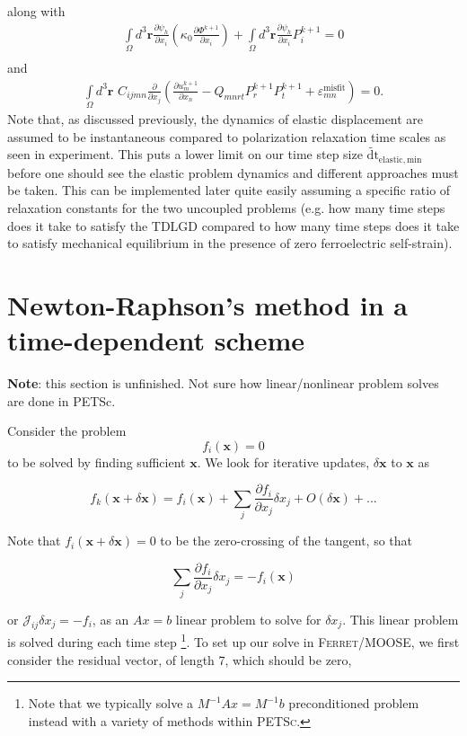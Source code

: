 \documentclass[16pt]{article} %
\begin{document}
%
along with
%
\begin{eqnarray}\nonumber
\int\limits_\Omega d^3 \textbf{r} \frac{\partial \psi_h}{\partial x_i} \left(\kappa_0 \frac{\partial \Phi^{k+1}}{\partial x_i} \right) + \int\limits_\Omega d^3 \textbf{r} \frac{\partial \psi_h}{\partial x_i} P_i^{k+1} = 0 \\ \nonumber
\end{eqnarray}
and 
\begin{eqnarray}\nonumber
\int\limits_\Omega d^3 \textbf{r} \,\,C_{ijmn} \frac{\partial}{\partial x_j} \left(\frac{\partial u^{k+1}_m}{\partial x_n} - Q_{mnrt} P_r^{k+1} P_t^{k+1}  + \varepsilon_{mn}^\mathrm{misfit}\right) = 0.
\end{eqnarray}
%
Note that, as discussed previously, the dynamics of elastic displacement are assumed to be instantaneous compared to polarization relaxation time scales as seen in experiment.
%
This puts a lower limit on our time step size $\widetilde{\mathrm{dt}}_\mathrm{elastic, min}$ before one should see the elastic problem dynamics and different approaches must be taken. This can be implemented later quite easily assuming a specific ratio of relaxation constants for the two uncoupled problems (e.g. how many time steps does it take to satisfy the TDLGD compared to how many time steps does it take to satisfy mechanical equilibrium in the presence of zero ferroelectric self-strain).
%
\section{Newton-Raphson's method in a time-dependent scheme}
%
\textbf{Note}: this section is unfinished. Not sure how linear/nonlinear problem solves are done in PETSc.
%

%
Consider the problem
%
$$f_i(\textbf{x}) = 0$$
%
to be solved by finding sufficient $\textbf{x}$. We look for iterative updates, $\delta \textbf{x}$ to $\textbf{x}$ as

$$f_k \left(\textbf{x} + \delta \textbf{x} \right) = f_i \left(\textbf{x} \right) + \sum\limits_j \frac{\partial f_i}{\partial x_j} \delta x_j + O(\delta \textbf{x}) + ...$$

Note that $f_i (\textbf{x} + \delta \textbf{x} ) = 0$ to be the zero-crossing of the tangent, so that

$$\sum\limits_j \frac{\partial f_i}{\partial x_j} \delta x_j = - f_i (\textbf{x})$$

or $\mathscr{J}_{ij} \delta x_j = - f_i$, as an $Ax = b$ linear problem to solve for $\delta x_j$. This linear problem is solved during each time step \footnote{Note that we typically solve a $M^{-1} A x = M^{-1} b$ preconditioned problem instead with a variety of methods within \textsc{PETSc}.}. 
%
To set up our solve in \textsc{Ferret}/\textsc{MOOSE}, we first consider the residual vector, of length 7, which should be zero,
\end{document}
